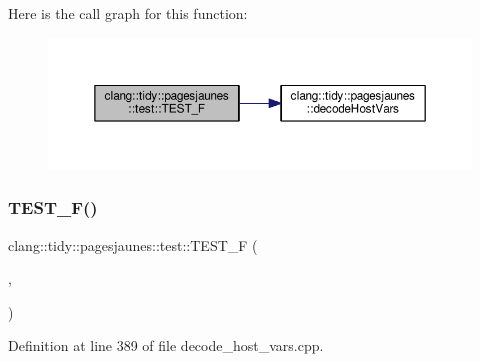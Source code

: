 Here is the call graph for this function\+:
\nopagebreak
\begin{figure}[H]
\begin{center}
\leavevmode
\includegraphics[width=350pt]{namespaceclang_1_1tidy_1_1pagesjaunes_1_1test_a4152664c7bb07378827d7cb3d4863daf_cgraph}
\end{center}
\end{figure}
\mbox{\label{namespaceclang_1_1tidy_1_1pagesjaunes_1_1test_a46ed8bf461236effdb50a1b3fcdd9076}} 
\subsubsection{\texorpdfstring{T\+E\+S\+T\+\_\+\+F()}{TEST\_F()}\hspace{0.1cm}{\footnotesize\ttfamily [53/57]}}
{\footnotesize\ttfamily clang\+::tidy\+::pagesjaunes\+::test\+::\+T\+E\+S\+T\+\_\+F (\begin{DoxyParamCaption}\item[{\hyperlink{classclang_1_1tidy_1_1pagesjaunes_1_1test_1_1_decode_host_vars_test}{Decode\+Host\+Vars\+Test}}]{,  }\item[{Decode\+Host\+Vars\+Pointer\+With\+Indicators}]{ }\end{DoxyParamCaption})}



Definition at line 389 of file decode\+\_\+host\+\_\+vars.\+cpp.

